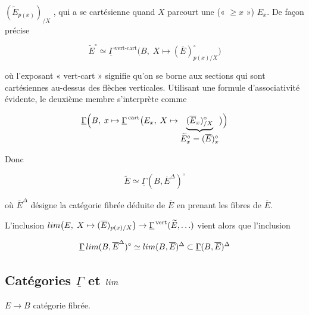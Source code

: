 \documentclass[11pt,a4paper]{article}
\begin{document}

$(\widetilde{E}_{p(x)})_{/X}$ ,
\struck{\ill{}} qui a se \ill{} cartésienne quand $X$ parcourt une \ill{}
(« \ill{} $\geq x$ ») $E_{x}$. De façon précise

\[ \widetilde{E}^{\circ} \simeq
   \underline{\Gamma}^{\,\text{vert-cart}}\bigl(B,\;
   X \mapsto (\overline{E})^{\circ}_{p(x)/X}\bigr) \]

où l'exposant « vert-cart » signifie qu'on se borne aux sections qui sont
cartésiennes au-dessus des flèches verticales. Utilisant une formule
d'associativité évidente, le deuxième membre s'interprète comme

\[ \underline{\Gamma}\Bigl(B,\; x \mapsto
   \underline{\Gamma}^{\,\mathrm{cart}}\bigl(E_{x},\;
   X \mapsto \underbrace{(\overline{E}_{x})^{\circ}_{/X}}
   _{\textstyle \widetilde{E}^{\circ}_{x} = (\overline{E})^{\circ}_{x}}
   \bigr)\Bigr) \]

Donc

\[ \widetilde{E} \simeq \underline{\Gamma}(B, \overline{E}^{\Delta})^{\circ} \]

où $\overline{E}^{\Delta}$ désigne la catégorie fibrée déduite de
$\overline{E}$ en prenant \struck{\ill{}}  les fibres de
$\overline{E}$.

L'inclusion $\varprojlim\bigl(E,\; X \mapsto
(\overline{E})_{p(x)/X}\bigr) \to \underline{\Gamma}^{\,\mathrm{vert}}
(\widetilde{E}, \ldots)$ vient alors \ill{} que l'inclusion

\[ \underline{\Gamma}\,\varprojlim(B, \overline{E}^{\Delta})^{\circ}
   \simeq \varprojlim(B, \overline{E})^{\Delta}
   \subset \underline{\Gamma}(B, \overline{E})^{\Delta} \]

\subsection*{Catégories $\underline{\Gamma}$ et $\varprojlim$}


$E \to B$ catégorie fibrée.

\end{document}
